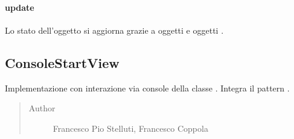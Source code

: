 \documentclass[letterpaper,10pt,italian,openany,oneside]{sphinxmanual}
\begin{document}
\begin{fulllineitems}
\label{\detokenize{source/it/unicam/cs/pa/mastermind/ui/ConsoleGameView:it.unicam.cs.pa.mastermind.ui.ConsoleGameView.showGame(BoardModel)}}
\end{fulllineitems}



\paragraph{update}
\label{\detokenize{source/it/unicam/cs/pa/mastermind/ui/ConsoleGameView:update}}

\begin{fulllineitems}
\label{\detokenize{source/it/unicam/cs/pa/mastermind/ui/ConsoleGameView:it.unicam.cs.pa.mastermind.ui.ConsoleGameView.update(Observable)}}
Lo stato dell’oggetto si aggiorna grazie a oggetti  e oggetti .

\end{fulllineitems}



\subsection{ConsoleStartView}
\label{\detokenize{source/it/unicam/cs/pa/mastermind/ui/ConsoleStartView:consolestartview}}\label{\detokenize{source/it/unicam/cs/pa/mastermind/ui/ConsoleStartView::doc}}

\begin{fulllineitems}
\label{\detokenize{source/it/unicam/cs/pa/mastermind/ui/ConsoleStartView:it.unicam.cs.pa.mastermind.ui.ConsoleStartView}}
Implementazione con interazione via console della classe . Integra il pattern .
\begin{quote}\begin{description}
\item[{Author}] \leavevmode
Francesco Pio Stelluti, Francesco Coppola

\end{description}\end{quote}

\end{fulllineitems}
\end{document}
